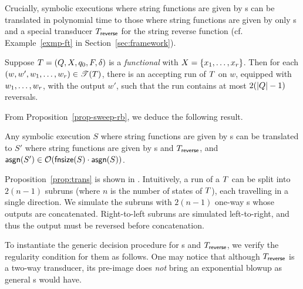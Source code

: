 Crucially, symbolic executions where string functions are given by \SPPT{}s can be translated in polynomial time to those where string functions are given by only \PT{}s and a special transducer $T_{\sf reverse}$ for the string reverse function  (cf. Example~\ref{exmp-ft} in Section~\ref{sec:framework}).  


\begin{proposition}\label{prop-sweep-rb}
Suppose $T=(Q, X, q_0, F, \delta)$ is a \emph{functional} \SPPT{}  with $X= \{x_1,\ldots, x_r\}$. Then for each $(w, w', w_1,\ldots, w_r) \in \mathscr{T}(T)$, there is an accepting run of $T$ on $w$, equipped with $w_1,\ldots, w_r$, with the output $w'$, such that the run contains at most $2(|Q|-1)$ reversals.
\end{proposition}

From Proposition~\ref{prop-sweep-rb}, we deduce the following result.

\begin{proposition} \label{prop:trans}
	Any symbolic execution $S$ where string functions are given by \SPPT{}s can be translated to $S'$ where string functions are given by \PT{}s and $T_{\sf reverse}$, and $ \mathsf{asgn}(S')\in \mathcal{O}(\mathsf{fnsize}(S) \cdot \mathsf{asgn}(S))$. 
\end{proposition}

Proposition~\ref{prop:trans} is shown in
.
Intuitively, a run of a \SPPT{} $T$ can be split into $2(n-1)$ subruns (where $n$ is the number of states of $T$), each travelling in a single direction.
We simulate the subruns with $2(n-1)$ one-way \PT{}s whose outputs are concatenated.
Right-to-left subruns are simulated left-to-right, and thus the output must be reversed before concatenation.





To instantiate the generic decision procedure for \PT{}s and $T_{\sf reverse}$, we verify the regularity condition \prerec{} for them as follows.
One may notice that although $T_{\sf reverse}$ is a two-way transducer, its pre-image does \emph{not} bring an exponential blowup as general \PPT{}s would have. 


